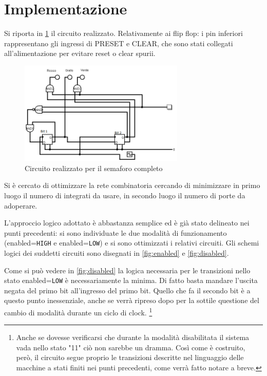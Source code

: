 \documentclass[a4paper,10pt]{article}
\def\code#1{\texttt{#1}}
\begin{document}
\section{Implementazione}

Si riporta in \cref{fig:circuit} il circuito realizzato.
Relativamente ai flip flop: i pin inferiori rappresentano gli ingressi di PRESET e CLEAR, che sono stati collegati all'alimentazione per evitare reset o clear spurii.

\begin{figure}[H]
	\centering
	\includegraphics[width=0.7\textwidth]{../grafici/circuito1.png}
	\caption{Circuito realizzato per il semaforo completo}
	\label{fig:circuit}
\end{figure}


Si è cercato di ottimizzare la rete combinatoria cercando di minimizzare in primo luogo il numero di integrati da usare, in secondo luogo il numero di porte da adoperare.

L'approccio logico adottato è abbastanza semplice ed è già stato delineato nei punti precedenti: si sono individuate le due modalità di funzionamento (enabled=\code{HIGH} e enabled=\code{LOW}) e si sono ottimizzati i relativi circuiti. 
Gli schemi logici dei suddetti circuiti sono disegnati in \cref{fig:enabled} e \cref{fig:disabled}.
\newline


Come si può vedere in \cref{fig:disabled} la logica necessaria per le transizioni nello stato enabled=\code{LOW} è necessariamente la minima. Di fatto basta mandare l'uscita negata del primo bit all'ingresso del primo bit. Quello che fa il secondo bit è a questo punto inessenziale, anche se verrà ripreso dopo per la sottile questione del cambio di modalità durante un ciclo di clock. \footnote{Anche se dovesse verificarsi che durante la modalità disabilitata il sistema vada nello stato "11" ciò non sarebbe un dramma. Così come è costruito, però, il circuito segue proprio le transizioni descritte nel linguaggio delle macchine a stati finiti nei punti precedenti, come verrà fatto notare a breve.}
\end{document}
